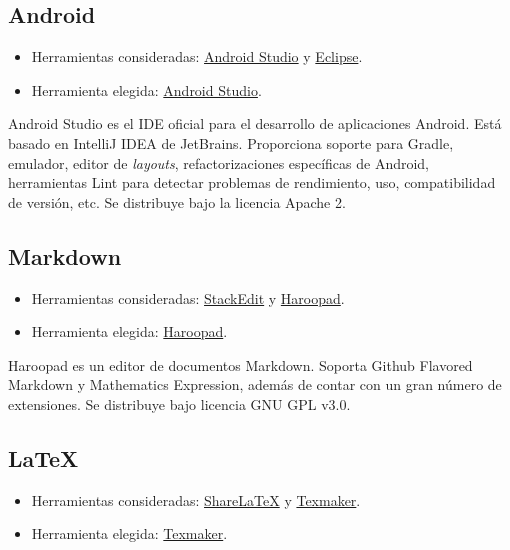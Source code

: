 \subsection{Android}\label{android}

\begin{itemize}
\tightlist
\item
  Herramientas consideradas:
  \href{https://developer.android.com/studio/index.html}{Android Studio}
  y \href{https://eclipse.org/}{Eclipse}.
\item
  Herramienta elegida:
  \href{https://developer.android.com/studio/index.html}{Android
  Studio}.
\end{itemize}

Android Studio es el IDE oficial para el desarrollo de aplicaciones
Android. Está basado en IntelliJ IDEA de JetBrains. Proporciona soporte
para Gradle, emulador, editor de \emph{layouts}, refactorizaciones
específicas de Android, herramientas Lint para detectar problemas de
rendimiento, uso, compatibilidad de versión, etc. Se distribuye bajo la
licencia Apache 2.

\subsection{Markdown}\label{markdown}

\begin{itemize}
\tightlist
\item
  Herramientas consideradas: \href{https://stackedit.io/}{StackEdit} y
  \href{http://pad.haroopress.com/}{Haroopad}.
\item
  Herramienta elegida: \href{http://pad.haroopress.com/}{Haroopad}.
\end{itemize}

Haroopad es un editor de documentos Markdown. Soporta Github Flavored
Markdown y Mathematics Expression, además de contar con un gran número
de extensiones. Se distribuye bajo licencia GNU GPL v3.0.

\subsection{LaTeX}\label{latex}

\begin{itemize}
\tightlist
\item
  Herramientas consideradas:
  \href{https://www.sharelatex.com/}{ShareLaTeX} y
  \href{http://www.xm1math.net/texmaker/}{Texmaker}.
\item
  Herramienta elegida:
  \href{http://www.xm1math.net/texmaker/}{Texmaker}.
\end{itemize}

